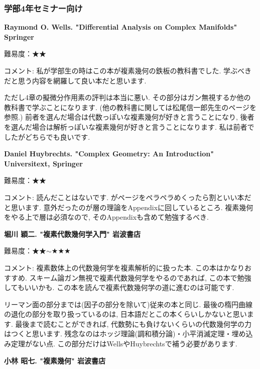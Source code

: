 \subsubsection{学部4年セミナー向け}


\textbf{Raymond O. Wells. "Differential Analysis on Complex Manifolds" Springer}  \vspace{-6pt}

難易度：★★　\vspace{-6pt}

コメント: 私が学部生の時はこの本が複素幾何の鉄板の教科書でした. 学ぶべきだと思う内容を網羅して良い本だと思います. 

ただし4章の擬微分作用素の評判は本当に悪い. その部分はガン無視するか他の教科書で学ぶことになります. (他の教科書に関しては松尾信一郎先生のページを参照.)
前者を選んだ場合は代数っぽいな複素幾何が好きと言うことになり, 後者を選んだ場合は解析っぽいな複素幾何が好きと言うことになります. 私は前者でしたがどちらでも良いです. 
\vspace{8pt}

\textbf{Daniel Huybrechts. "Complex Geometry: An Introduction" Universitext, Springer} \vspace{-6pt}
 
難易度：★★ \vspace{-6pt}

コメント: 読んだことはないです. がページをペラペラめくったら割といい本だと思います. 意外だったのが層の理論をAppendixに回しているところ. 複素幾何をやる上で層は必須なので, そのAppendixも含めて勉強するべき. 
\vspace{8pt}

\textbf{堀川 穎二. "複素代数幾何学入門" 岩波書店}

難易度：★★$\sim$★★★ \vspace{-6pt} 

コメント: 複素数体上の代数幾何学を複素解析的に扱った本. この本はかなりおすすめ. スキーム論ガン無視で複素代数幾何学をやるのであれば, この本で勉強してもいいかも. この本を読んで複素代数幾何学の道に進むのは可能です. 

リーマン面の部分までは(因子の部分を除いて)従来の本と同じ. 最後の楕円曲線の退化の部分を取り扱っているのは, 日本語だとこの本くらいしかないと思います. 最後まで読むことができれば, 代数勢にも負けないくらいの代数幾何学の力はつくと思います. 残念なのはホッジ理論(調和積分論)・小平消滅定理・埋め込み定理がない点.  この部分だけはWellsやHuybrechtsで補う必要があります. 
\vspace{8pt}

\textbf{小林 昭七. "複素幾何" 岩波書店}  \vspace{-6pt} 


